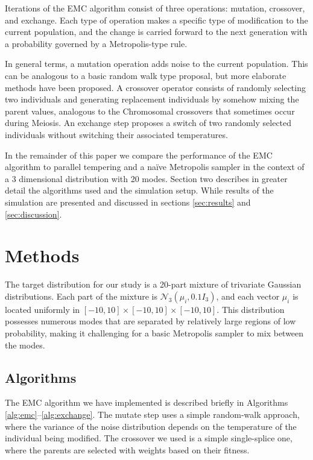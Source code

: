 \documentclass[12pt]{article}\usepackage[]{graphicx}\usepackage[]{color}
\begin{document}
Iterations of the EMC algorithm consist of three operations: mutation,
crossover, and exchange. Each type of operation makes a specific type
of modification to the current population, and the change is carried
forward to the next generation with a probability governed by a
Metropolis-type rule.

In general terms, a mutation operation adds noise to the current
population. This can be analogous to a basic random walk type
proposal, but more elaborate methods have been
proposed. A crossover operator consists of
randomly selecting two individuals and generating replacement
individuals by somehow mixing the parent values, analogous to the
Chromosomal crossovers that sometimes occur during Meiosis.  An
exchange step proposes a switch of two randomly selected individuals
without switching their associated temperatures.


In the remainder of this paper we compare the performance of the EMC
algorithm to parallel tempering and a na\"ive Metropolis sampler in
the context of a 3 dimensional distribution with 20 modes.  Section
two describes in greater detail the algorithms used and the simulation
setup.  While results of the simulation are presented and discussed in
sections \ref{sec:results} and \ref{sec:discussion}.

\setcounter{section}{1}
\section{Methods}
\label{sec:methods}
The target distribution for our study is a 20-part mixture of
trivariate Gaussian distributions. Each part of the mixture is
$\mathcal{N}_3(\mu_i, 0.1I_3)$, and each vector $\mu_i$ is located
uniformly in $[-10,10]\times[-10,10]\times[-10,10].$ This distribution
possesses numerous modes that are separated by relatively large
regions of low probability, making it challenging for a basic
Metropolis sampler to mix between the modes.

\subsection{Algorithms}
\label{sec:algorithms}

The EMC algorithm we have implemented is described briefly in
Algorithms \ref{alg:emc}--\ref{alg:exchange}.  The mutate step uses a
simple random-walk approach, where the variance of the noise
distribution depends on the temperature of the individual being
modified.  The crossover we used is a simple single-splice one, where
the parents are selected with weights based on their fitness.
\end{document}
